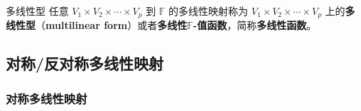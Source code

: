 
\begin{definition}{多线性型}\label{def_MulMap_2}
任意 $V_1\times V_2\times\cdots\times V_p$ 到 $\mathbb{F}$ 的多线性映射称为 $V_1\times V_2\times\cdots\times V_p$ 上的\textbf{多线性型}（\textbf{multilinear form}）或者\textbf{多线性$\mathbb{F}$-值函数}，简称\textbf{多线性函数}。
\end{definition}


% 

\subsection{对称/反对称多线性映射}


\subsubsection{对称多线性映射}

